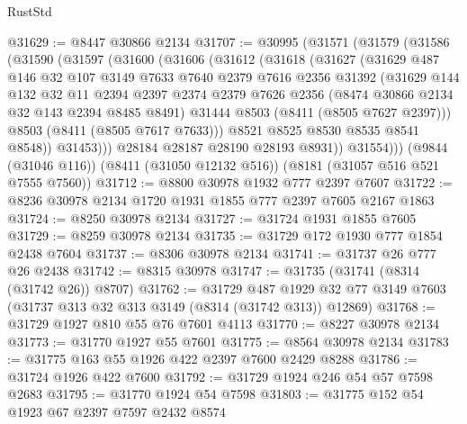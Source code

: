 \begin{lexlean}{RustStd}
\begin{coremodule}
@31629 := @8447 @30866 @2134
@31707 := @30995
    (@31571
      (@31579
        (@31586
          (@31590
            (@31597
              (@31600
                (@31606
                  (@31612
                    (@31618
                      (@31627
                        (@31629
                          @487
                          @146
                          @32
                          @107
                          @3149
                          @7633
                          @7640
                          @2379
                          @7616
                          @2356
                          @31392
                          (@31629
                            @144
                            @132
                            @32
                            @11
                            @2394
                            @2397
                            @2374
                            @2379
                            @7626
                            @2356
                            (@8474 @30866 @2134 @32 @143 @2394 @8485 @8491)
                            @31444
                            @8503
                            (@8411 (@8505 @7627 @2397)))
                          @8503
                          (@8411 (@8505 @7617 @7633)))
                        @8521
                        @8525
                        @8530
                        @8535
                        @8541
                        @8548))
                    @31453)))
              @28184
              @28187
              @28190
              @28193
              @8931))
          @31554)))
    (@9844 (@31046 @116))
    (@8411 (@31050 @12132 @516))
    (@8181 (@31057 @516 @521 @7555 @7560))
@31712 := @8800 @30978 @1932 @777 @2397 @7607
@31722 := @8236 @30978 @2134 @1720 @1931 @1855 @777 @2397 @7605 @2167 @1863
@31724 := @8250 @30978 @2134
@31727 := @31724 @1931 @1855 @7605
@31729 := @8259 @30978 @2134
@31735 := @31729 @172 @1930 @777 @1854 @2438 @7604
@31737 := @8306 @30978 @2134
@31741 := @31737 @26 @777 @26 @2438
@31742 := @8315 @30978
@31747 := @31735 (@31741 (@8314 (@31742 @26)) @8707)
@31762 := @31729
    @487
    @1929
    @32
    @77
    @3149
    @7603
    (@31737 @313 @32 @313 @3149 (@8314 (@31742 @313)) @12869)
@31768 := @31729 @1927 @810 @55 @76 @7601 @4113
@31770 := @8227 @30978 @2134
@31773 := @31770 @1927 @55 @7601
@31775 := @8564 @30978 @2134
@31783 := @31775 @163 @55 @1926 @422 @2397 @7600 @2429 @8288
@31786 := @31724 @1926 @422 @7600
@31792 := @31729 @1924 @246 @54 @57 @7598 @2683
@31795 := @31770 @1924 @54 @7598
@31803 := @31775 @152 @54 @1923 @67 @2397 @7597 @2432 @8574

\end{coremodule}
\end{lexlean}
